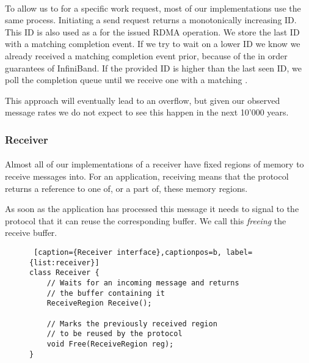 \paragraph{} To allow us to  for a specific work request, most of our implementations use the same process. 
Initiating a send request returns a monotonically increasing ID. This ID is also used as a  for the issued RDMA
operation. We store the last ID with a matching completion event. If we try to wait on a lower ID we know we already received 
a matching completion event prior, because of the in order guarantees of InfiniBand. If the provided ID is higher than the
last seen ID, we poll the completion queue until we receive one with a matching .

This approach will eventually lead to an overflow, but given our observed  message rates we do not expect to see this 
happen in the next 10'000 years. 

\subsubsection{Receiver}

\paragraph{} Almost all of our implementations of a receiver have fixed regions of memory to receive messages into. 
For an application, receiving means that the protocol returns a reference to one of, or a part of, these memory regions. 

As soon as the application  has processed this message it needs to signal to the protocol that it can reuse the corresponding
buffer. We call this \emph{freeing} the receive buffer.

\begin{figure}[htp]
\begin{lstlisting} [caption={Receiver interface},captionpos=b, label={list:receiver}] 
class Receiver {
    // Waits for an incoming message and returns
    // the buffer containing it
    ReceiveRegion Receive();

    // Marks the previously received region 
    // to be reused by the protocol
    void Free(ReceiveRegion reg);
}
\end{lstlisting}
\end{figure}







